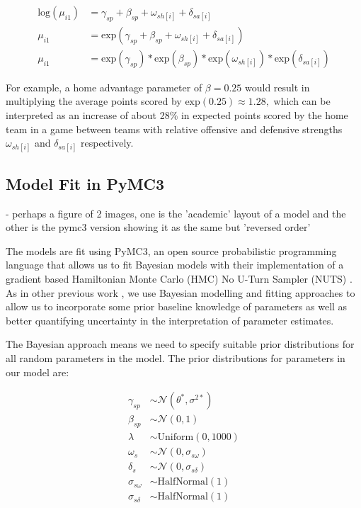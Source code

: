 \begin{equation}
\begin{split}
\text{log}(\mu_{i1}) &= \gamma_{sp} + \beta_{sp} + \omega_{sh[i]} + \delta_{sa[i]} \\
\mu_{i1} &= \text{exp}(\gamma_{sp} + \beta_{sp} + \omega_{sh[i]} + \delta_{sa[i]}) \\
\mu_{i1} &= \text{exp}(\gamma_{sp})*\text{exp}(\beta_{sp})*\text{exp}(\omega_{sh[i]})*\text{exp}(\delta_{sa[i]})
\end{split}
\end{equation}

For example, a home advantage parameter of \(\beta = 0.25\) would result in multiplying the average points scored by \(\text{exp}(0.25) \approx 1.28,\) which can be interpreted as an increase of about 28\% in expected points scored by the home team in a game between teams with relative offensive and defensive strengths \(\omega_{sh[i]}\) and \(\delta_{sa[i]}\) respectively.

\subsection{Model Fit in PyMC3}

- perhaps a figure of 2 images, one is the 'academic' layout of a model and the other is the pymc3 version showing it as the same but 'reversed order'

The models are fit using PyMC3, an open source probabilistic programming language that allows us to fit Bayesian models with their implementation of a gradient based Hamiltonian Monte Carlo (HMC) No U-Turn Sampler (NUTS) \cite{pymc3}. As in other previous work \cite{Baio2010} \cite{Benz2020}, we use Bayesian modelling and fitting approaches to allow us to incorporate some prior baseline knowledge of parameters as well as better quantifying uncertainty in the interpretation of parameter estimates.

The Bayesian approach means we need to specify suitable prior distributions for all random parameters in the model. The prior distributions for parameters in our model are:

\begin{equation} \label{eq:priors}
\begin{split}
\gamma_{sp} &\sim \mathcal{N}(\theta^*, \sigma^{2*}) \\
\beta_{sp} &\sim \mathcal{N}(0, 1) \\
\lambda &\sim \text{Uniform}(0, 1000) \\
\omega_s &\sim \mathcal{N}(0, \sigma_{s\omega}) \\
\delta_s &\sim \mathcal{N}(0, \sigma_{s\delta}) \\
\sigma_{s\omega} &\sim \text{HalfNormal}(1) \\
\sigma_{s\delta} &\sim \text{HalfNormal}(1)
\end{split}
\end{equation}

